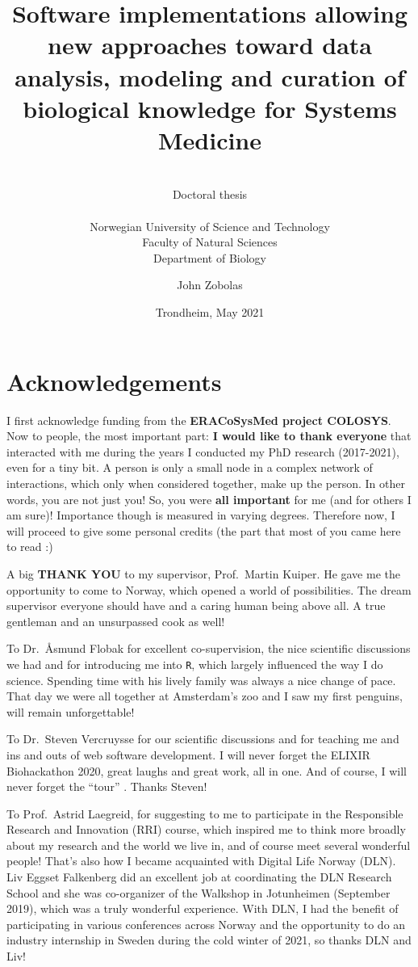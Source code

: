 \documentclass[
  12pt,
]{book}
\title{Software implementations allowing new approaches toward data analysis, modeling and curation of biological knowledge for Systems Medicine}
\subtitle{~\\
Doctoral thesis\\
\hspace*{0.333em}\\
Norwegian University of Science and Technology\\
Faculty of Natural Sciences\\
Department of Biology}
\author{John Zobolas}
\date{Trondheim, May 2021}
\begin{document}
\maketitle

{
\hypersetup{linkcolor=}
\setcounter{tocdepth}{1}
\tableofcontents
}
\hypertarget{acknowledgements}{%
\chapter*{Acknowledgements}\label{acknowledgements}}

\vspace{-30pt}
\indent

I first acknowledge funding from the \textbf{ERACoSysMed project COLOSYS}. Now to people, the most important part: \textbf{I would like to thank everyone} that interacted with me during the years I conducted my PhD research (2017-2021), even for a tiny bit. A person is only a small node in a complex network of interactions, which only when considered together, make up the person. In other words, you are not just you! So, you were \textbf{all important} for me (and for others I am sure)! Importance though is measured in varying degrees. Therefore now, I will proceed to give some personal credits (the part that most of you came here to read :)

A big \textbf{THANK YOU} to my supervisor, Prof.~Martin Kuiper. He gave me the opportunity to come to Norway, which opened a world of possibilities. The dream supervisor everyone should have and a caring human being above all. A true gentleman and an unsurpassed cook as well!

To Dr.~Åsmund Flobak for excellent co-supervision, the nice scientific discussions we had and for introducing me into \texttt{R}, which largely influenced the way I do science. Spending time with his lively family was always a nice change of pace. That day we were all together at Amsterdam's zoo and I saw my first penguins, will remain unforgettable!

To Dr.~Steven Vercruysse for our scientific discussions and for teaching me and ins and outs of web software development. I will never forget the ELIXIR Biohackathon 2020, great laughs and great work, all in one. And of course, I will never forget the ``tour'' . Thanks Steven!

To Prof.~Astrid Laegreid, for suggesting to me to participate in the Responsible Research and Innovation (RRI) course, which inspired me to think more broadly about my research and the world we live in, and of course meet several wonderful people! That's also how I became acquainted with Digital Life Norway (DLN). Liv Eggset Falkenberg did an excellent job at coordinating the DLN Research School and she was co-organizer of the Walkshop in Jotunheimen (September 2019), which was a truly wonderful experience. With DLN, I had the benefit of participating in various conferences across Norway and the opportunity to do an industry internship in Sweden during the cold winter of 2021, so thanks DLN and Liv!
\end{document}
